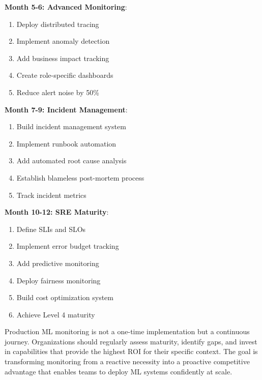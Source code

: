 \textbf{Month 5-6: Advanced Monitoring}:
\begin{enumerate}
    \item Deploy distributed tracing
    \item Implement anomaly detection
    \item Add business impact tracking
    \item Create role-specific dashboards
    \item Reduce alert noise by 50\%
\end{enumerate}

\textbf{Month 7-9: Incident Management}:
\begin{enumerate}
    \item Build incident management system
    \item Implement runbook automation
    \item Add automated root cause analysis
    \item Establish blameless post-mortem process
    \item Track incident metrics
\end{enumerate}

\textbf{Month 10-12: SRE Maturity}:
\begin{enumerate}
    \item Define SLIs and SLOs
    \item Implement error budget tracking
    \item Add predictive monitoring
    \item Deploy fairness monitoring
    \item Build cost optimization system
    \item Achieve Level 4 maturity
\end{enumerate}

Production ML monitoring is not a one-time implementation but a continuous journey. Organizations should regularly assess maturity, identify gaps, and invest in capabilities that provide the highest ROI for their specific context. The goal is transforming monitoring from a reactive necessity into a proactive competitive advantage that enables teams to deploy ML systems confidently at scale.
